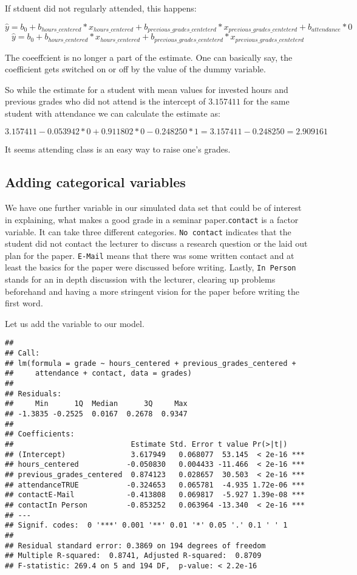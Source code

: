\documentclass[
]{book}
\begin{document}
If stduent did not regularly attended, this happens:

\[\hat{y} = b_0 + b_{hours\_centered}*x_{hours\_centered} + b_{previous\_grades\_centeterd}*x_{previous\_grades\_centeterd} + b_{attendance} * 0\]
\[\hat{y} = b_0 + b_{hours\_centered}*x_{hours\_centered} + b_{previous\_grades\_centeterd}*x_{previous\_grades\_centeterd}\]

The coeeffcient is no longer a part of the estimate. One can basically say, the
coefficient gets switched on or off by the value of the dummy variable.

So while the estimate for a student with mean values for invested hours and
previous grades who did not attend is the intercept of \(3.157411\) for the same
student with attendance we can calculate the estimate as:

\[3.157411 - 0.053942*0 + 0.911802*0 - 0.248250 * 1 = 3.157411 - 0.248250 = 2.909161\]

It seems attending class is an easy way to raise one's grades.

\hypertarget{adding-categorical-variables}{%
\subsection{Adding categorical variables}\label{adding-categorical-variables}}

We have one further variable in our simulated data set that could be of interest
in explaining, what makes a good grade in a seminar paper.\texttt{contact} is a factor
variable. It can take three different categories. \texttt{No\ contact} indicates that
the student did not contact the lecturer to discuss a research question or the
laid out plan for the paper. \texttt{E-Mail} means that there was some written contact
and at least the basics for the paper were discussed before writing. Lastly,
\texttt{In\ Person} stands for an in depth discussion with the lecturer, clearing up
problems beforehand and having a more stringent vision for the paper before
writing the first word.

Let us add the variable to our model.

\begin{verbatim}
## 
## Call:
## lm(formula = grade ~ hours_centered + previous_grades_centered + 
##     attendance + contact, data = grades)
## 
## Residuals:
##     Min      1Q  Median      3Q     Max 
## -1.3835 -0.2525  0.0167  0.2678  0.9347 
## 
## Coefficients:
##                           Estimate Std. Error t value Pr(>|t|)    
## (Intercept)               3.617949   0.068077  53.145  < 2e-16 ***
## hours_centered           -0.050830   0.004433 -11.466  < 2e-16 ***
## previous_grades_centered  0.874123   0.028657  30.503  < 2e-16 ***
## attendanceTRUE           -0.324653   0.065781  -4.935 1.72e-06 ***
## contactE-Mail            -0.413808   0.069817  -5.927 1.39e-08 ***
## contactIn Person         -0.853252   0.063964 -13.340  < 2e-16 ***
## ---
## Signif. codes:  0 '***' 0.001 '**' 0.01 '*' 0.05 '.' 0.1 ' ' 1
## 
## Residual standard error: 0.3869 on 194 degrees of freedom
## Multiple R-squared:  0.8741, Adjusted R-squared:  0.8709 
## F-statistic: 269.4 on 5 and 194 DF,  p-value: < 2.2e-16
\end{verbatim}
\end{document}
